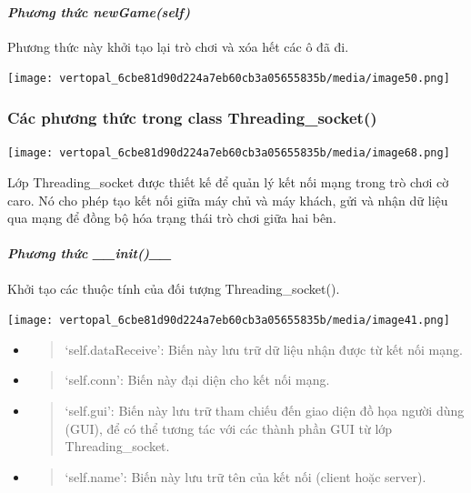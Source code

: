 \documentclass[a4paper]{article}
\begin{document}
\hypertarget{phux1b0ux1a1ng-thux1ee9c-newgameself}{%
\paragraph{\texorpdfstring{\emph{Phương thức
newGame(self)}}{Phương thức newGame(self)}}\label{phux1b0ux1a1ng-thux1ee9c-newgameself}}

Phương thức này khởi tạo lại trò chơi và xóa hết các ô đã đi.

\texttt{[image: vertopal\_6cbe81d90d224a7eb60cb3a05655835b/media/image50.png]}

\hypertarget{cuxe1c-phux1b0ux1a1ng-thux1ee9c-trong-class-threading_socket}{%
\subsubsection{\texorpdfstring{Các phương thức trong class
Threading\_socket()
}{Các phương thức trong class Threading\_socket() }}\label{cuxe1c-phux1b0ux1a1ng-thux1ee9c-trong-class-threading_socket}}

\texttt{[image: vertopal\_6cbe81d90d224a7eb60cb3a05655835b/media/image68.png]}

Lớp Threading\_socket được thiết kế để quản lý kết nối mạng trong trò
chơi cờ caro. Nó cho phép tạo kết nối giữa máy chủ và máy khách, gửi và
nhận dữ liệu qua mạng để đồng bộ hóa trạng thái trò chơi giữa hai bên.

\hypertarget{phux1b0ux1a1ng-thux1ee9c-__init__}{%
\paragraph{\texorpdfstring{\emph{Phương thức
\_\_init()\_\_}}{Phương thức \_\_init()\_\_}}\label{phux1b0ux1a1ng-thux1ee9c-__init__}}

Khởi tạo các thuộc tính của đối tượng Threading\_socket().

\texttt{[image: vertopal\_6cbe81d90d224a7eb60cb3a05655835b/media/image41.png]}

\begin{itemize}
\item
  \begin{quote}
  `self.dataReceive': Biến này lưu trữ dữ liệu nhận được từ kết nối
  mạng.
  \end{quote}
\item
  \begin{quote}
  `self.conn': Biến này đại diện cho kết nối mạng.
  \end{quote}
\item
  \begin{quote}
  `self.gui': Biến này lưu trữ tham chiếu đến giao diện đồ họa người
  dùng (GUI), để có thể tương tác với các thành phần GUI từ lớp
  Threading\_socket.
  \end{quote}
\item
  \begin{quote}
  `self.name': Biến này lưu trữ tên của kết nối (client hoặc server).
  \end{quote}
\end{itemize}
\end{document}
